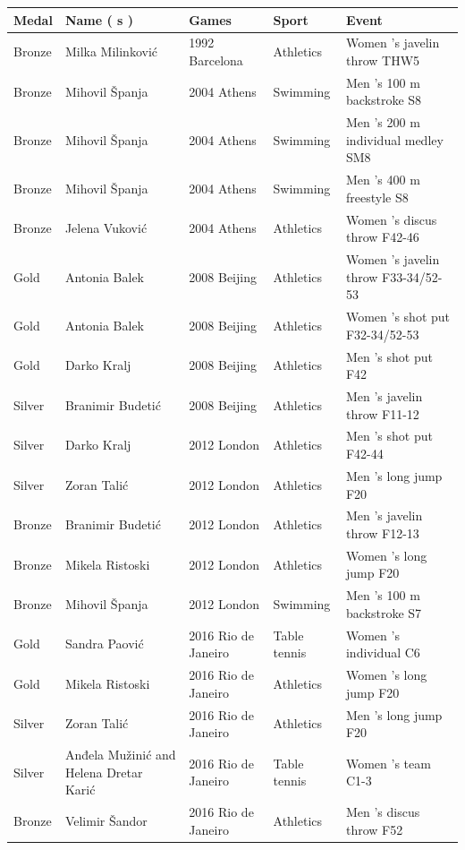 \documentclass{article}
\begin{document}
\begin{tabular}{lllll}
\toprule
Medal & Name ( s ) & Games & Sport & Event \\
\midrule
Bronze & Milka Milinković & 1992 Barcelona & Athletics & Women 's javelin throw THW5 \\
Bronze & Mihovil Španja & 2004 Athens & Swimming & Men 's 100 m backstroke S8 \\
Bronze & Mihovil Španja & 2004 Athens & Swimming & Men 's 200 m individual medley SM8 \\
Bronze & Mihovil Španja & 2004 Athens & Swimming & Men 's 400 m freestyle S8 \\
Bronze & Jelena Vuković & 2004 Athens & Athletics & Women 's discus throw F42-46 \\
Gold & Antonia Balek & 2008 Beijing & Athletics & Women 's javelin throw F33-34/52-53 \\
Gold & Antonia Balek & 2008 Beijing & Athletics & Women 's shot put F32-34/52-53 \\
Gold & Darko Kralj & 2008 Beijing & Athletics & Men 's shot put F42 \\
Silver & Branimir Budetić & 2008 Beijing & Athletics & Men 's javelin throw F11-12 \\
Silver & Darko Kralj & 2012 London & Athletics & Men 's shot put F42-44 \\
Silver & Zoran Talić & 2012 London & Athletics & Men 's long jump F20 \\
Bronze & Branimir Budetić & 2012 London & Athletics & Men 's javelin throw F12-13 \\
Bronze & Mikela Ristoski & 2012 London & Athletics & Women 's long jump F20 \\
Bronze & Mihovil Španja & 2012 London & Swimming & Men 's 100 m backstroke S7 \\
Gold & Sandra Paović & 2016 Rio de Janeiro & Table tennis & Women 's individual C6 \\
Gold & Mikela Ristoski & 2016 Rio de Janeiro & Athletics & Women 's long jump F20 \\
Silver & Zoran Talić & 2016 Rio de Janeiro & Athletics & Men 's long jump F20 \\
Silver & Anđela Mužinić and Helena Dretar Karić & 2016 Rio de Janeiro & Table tennis & Women 's team C1-3 \\
Bronze & Velimir Šandor & 2016 Rio de Janeiro & Athletics & Men 's discus throw F52 \\
\bottomrule
\end{tabular}
\end{document}
